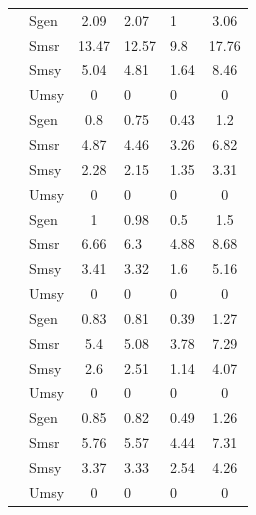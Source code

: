 \documentclass[11pt]{book}
\begin{document}
\begin{longtable}[t]{llcllc}
\cmidrule{1-6}\pagebreak[0]  & Sgen & 2.09 & 2.07 & 1 & 3.06\\
\cmidrule{2-6}\nopagebreak  & Smsr & 13.47 & 12.57 & 9.8 & 17.76\\
\cmidrule{2-6}\nopagebreak  & Smsy & 5.04 & 4.81 & 1.64 & 8.46\\
\cmidrule{2-6}\nopagebreak \multirow{-4}{*}{\raggedright\arraybackslash Pelly} & Umsy & 0 & 0 & 0 & 0\\
\cmidrule{1-6}\pagebreak[0]  & Sgen & 0.8 & 0.75 & 0.43 & 1.2\\
\cmidrule{2-6}\nopagebreak  & Smsr & 4.87 & 4.46 & 3.26 & 6.82\\
\cmidrule{2-6}\nopagebreak  & Smsy & 2.28 & 2.15 & 1.35 & 3.31\\
\cmidrule{2-6}\nopagebreak \multirow{-4}{*}{\raggedright\arraybackslash Stewart} & Umsy & 0 & 0 & 0 & 0\\
\cmidrule{1-6}\pagebreak[0]  & Sgen & 1 & 0.98 & 0.5 & 1.5\\
\cmidrule{2-6}\nopagebreak  & Smsr & 6.66 & 6.3 & 4.88 & 8.68\\
\cmidrule{2-6}\nopagebreak  & Smsy & 3.41 & 3.32 & 1.6 & 5.16\\
\cmidrule{2-6}\nopagebreak \multirow{-4}{*}{\raggedright\arraybackslash UpperYukonR} & Umsy & 0 & 0 & 0 & 0\\
\cmidrule{1-6}\pagebreak[0]  & Sgen & 0.83 & 0.81 & 0.39 & 1.27\\
\cmidrule{2-6}\nopagebreak  & Smsr & 5.4 & 5.08 & 3.78 & 7.29\\
\cmidrule{2-6}\nopagebreak  & Smsy & 2.6 & 2.51 & 1.14 & 4.07\\
\cmidrule{2-6}\nopagebreak \multirow{-4}{*}{\raggedright\arraybackslash Whiteandtribs} & Umsy & 0 & 0 & 0 & 0\\
\cmidrule{1-6}\pagebreak[0]  & Sgen & 0.85 & 0.82 & 0.49 & 1.26\\
\cmidrule{2-6}\nopagebreak  & Smsr & 5.76 & 5.57 & 4.44 & 7.31\\
\cmidrule{2-6}\nopagebreak  & Smsy & 3.37 & 3.33 & 2.54 & 4.26\\
\cmidrule{2-6}\nopagebreak \multirow{-4}{*}{\raggedright\arraybackslash YukonR Teslinheadwaters} & Umsy & 0 & 0 & 0 & 0\\* \end{longtable}

\clearpage
\end{document}
